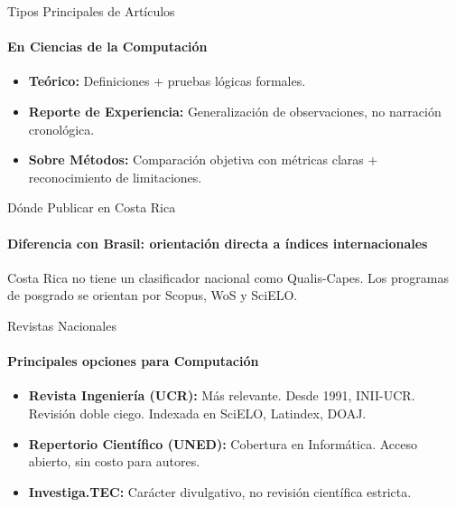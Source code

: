 \documentclass[aspectratio=169, 12pt]{beamer}
\begin{document}
\begin{frame}{Tipos Principales de Artículos}
  \framesubtitle{En Ciencias de la Computación}
  \vspace{-2pt}

  \begin{itemize}
    \item {\bfseries Teórico:} Definiciones + pruebas lógicas formales.
    \item {\bfseries Reporte de Experiencia:} Generalización de observaciones, no narración cronológica.
    \item {\bfseries Sobre Métodos:} Comparación objetiva con métricas claras + reconocimiento de limitaciones.
  \end{itemize}
\end{frame}

\begin{frame}{Dónde Publicar en Costa Rica}
  \framesubtitle{Diferencia con Brasil: orientación directa a índices internacionales}
  \vspace{-2pt}

  {\color{Cloud}\sffamily Costa Rica no tiene un clasificador nacional como Qualis-Capes. Los programas de posgrado se orientan por Scopus, WoS y SciELO.}
\end{frame}

\begin{frame}{Revistas Nacionales}
  \framesubtitle{Principales opciones para Computación}
  \vspace{-2pt}

  \begin{itemize}
    \item {\bfseries Revista Ingeniería (UCR):} Más relevante. Desde 1991, INII-UCR. Revisión doble ciego. Indexada en SciELO, Latindex, DOAJ.
    \item {\bfseries Repertorio Científico (UNED):} Cobertura en Informática. Acceso abierto, sin costo para autores.
    \item {\bfseries Investiga.TEC:} Carácter divulgativo, no revisión científica estricta.
  \end{itemize}
\end{frame}
\end{document}
